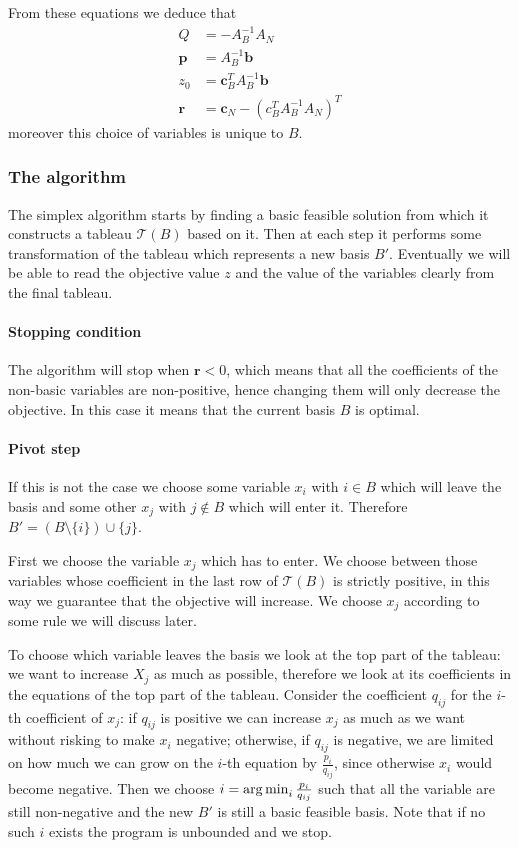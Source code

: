 \documentclass[12pt]{extarticle}
\renewcommand{\vec}[1]{\bm{#1}}
\begin{document}
From these equations we deduce that
\begin{align}
	Q      & = -A_B^{-1} A_N                     \\
	\vec p & = A_B^{-1} \vec b                   \\
	z_0    & = \vec c_B^T A_B^{-1} \vec b        \\
	\vec r & = \vec c_N - (c^T_B A^{-1}_B A_N)^T
\end{align}
moreover this choice of variables is unique to $B$.

\subsubsection{The algorithm}

The simplex algorithm starts by finding a basic feasible solution from which it constructs a tableau
$\mathcal T(B)$ based on it.
Then at each step it performs some transformation of the tableau which represents a new basis $B'$.
Eventually we will be able to read the objective value $z$ and the value of the variables clearly
from the final tableau.

\paragraph{Stopping condition}
The algorithm will stop when $\vec r < 0$, which means that all the coefficients of the non-basic
variables are non-positive, hence changing them will only decrease the objective.
In this case it means that the current basis $B$ is optimal.

\paragraph{Pivot step}
If this is not the case we choose some variable $x_i$ with $i \in B$ which will leave the basis and
some other $x_j$ with $j \notin B$ which will enter it.
Therefore $B'= (B \setminus \{i\}) \cup \{j\}$.

First we choose the variable $x_j$ which has to enter. We choose between those variables whose
coefficient in the last row of $\mathcal T(B)$ is strictly positive, in this way we guarantee that
the objective will increase.
We choose $x_j$ according to some rule we will discuss later.

To choose which variable leaves the basis we look at the top part of the tableau: we want to increase
$X_j$ as much as possible, therefore we look at its coefficients in the equations of the top part of
the tableau.
Consider the coefficient $q_{ij}$ for the $i$-th coefficient of $x_j$: if $q_{ij}$ is positive we
can increase $x_j$ as much as we want without risking to make $x_i$ negative; otherwise, if $q_{ij}$
is negative, we are limited on how much we can grow on the $i$-th equation by $\frac{p_i}{q_{ij}}$,
since otherwise $x_i$ would become negative.
Then we choose $i = \operatorname*{arg\,min}_{i} \frac{p_i}{q_{ij}}$ such that all the variable are still
non-negative and the new $B'$ is still a basic feasible basis.
Note that if no such $i$ exists the program is unbounded and we stop.
\end{document}
